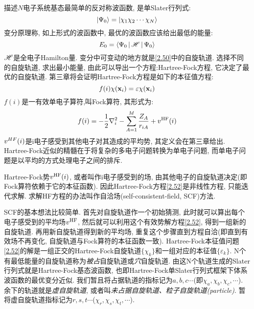 描述$N$电子系统基态最简单的反对称波函数, 是单Slater行列式:
\begin{equation}
\Ket{\Psi_0}=\Ket{\chi_1\chi_2\cdots\chi_N}
\end{equation}
变分原理称, 如上形式的波函数中, 最优的波函数应该给出最低的能量:
\begin{equation}
E_0=\Braket{\Psi_0|\mathscr{H}|\Psi_0}
\end{equation}
$\mathscr{H}$是全电子Hamilton量. 变分中可变动的地方就是\ref{2.50}中的自旋轨道. 选择不同的自旋轨道, 求出最小能量, 由此可以导出一个方程:Hartree-Fock方程, 它决定了最优的自旋轨道. 第三章将会证明Hartree-Fock方程是如下的本征值方程:
\begin{equation}
f(i)\chi(\mathbf{x}_i)=\varepsilon\chi(\mathbf{x}_i)
\label{2.52}
\end{equation}
$f(i)$是一有效单电子算符,叫Fock算符, 其形式为:
\begin{equation}
\label{2.53}
f(i)=-\frac{1}{2}\nabla_i^2 - \sum_{A=1}^M\frac{Z_A}{r_{iA}} + v^{\rm HF}(i)
\end{equation}
$v^{HF\rm}(i)$是i电子感受到其他电子对其造成的平均势, 其定义会在第三章给出. Hartree-Fock近似的精髓在于将复杂的多电子问题转换为单电子问题, 而单电子问题是以平均的方式处理电子之间的排斥.

Hartree-Fock势$v^{\rm HF}(i)$, 或者叫作i电子感受到的场, 由其他电子的自旋轨道决定(即Fock算符依赖于它的本征函数).  因此Hartree-Fock方程\ref{2.52}是非线性方程, 只能迭代求解. 求解HF方程的办法叫作自洽场(self-consistent-field, SCF)方法.

SCF的基本想法比较简单. 首先对自旋轨道作一个初始猜测, 此时就可以算出每个电子感受到的平均场$v^{\rm HF}$, 然后就可以利用这个有效势解方程\ref{2.52}, 得到一组新的自旋轨道. 再用新自旋轨道得到新的平均场, 重复这个步骤直到方程自洽(即直到有效场不再变化, 自旋轨道与Fock算符的本征函数一致).
Hartree-Fock本征值问题\ref{2.52}的解是一组正交的Hartree-Fock自旋轨道$\{\chi_k\}$和一组对应的本征值$\{\varepsilon_k\}$. N个有最低能量的自旋轨道称为\emph{被占}自旋轨道或\emph{穴}自旋轨道. 由这N个轨道生成的Slater行列式就是Hartree-Fock基态波函数, 也即Hartree-Fock单Slater行列式框架下体系波函数的最优变分近似. 我们暂且将占据轨道的指标记为$a,b,c\cdots$(即$\chi_a,\chi_b,\chi_c,\cdots$). 余下的轨道就是\emph{虚自旋轨道}, 或者叫\emph{未占据自旋轨道、粒子自旋轨道(particle)}. 暂将虚自旋轨道指标记为$r,s,t\cdots$($\chi_r,\chi_s,\chi_t,\cdots$).

